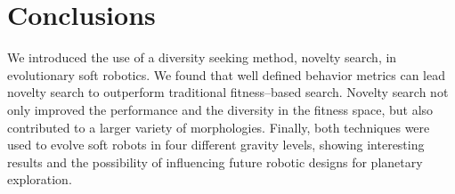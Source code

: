 \documentclass{sig-alternate}
\begin{document}
\section{Conclusions}
We introduced the use of a diversity seeking method, novelty search, in evolutionary soft robotics. 
We found that well defined behavior metrics can lead novelty search to outperform traditional fitness--based search. Novelty search not only improved the performance and the diversity in the fitness space, but also contributed to a larger variety of morphologies. Finally, both techniques were used to evolve soft robots in four different gravity levels, showing interesting results and the possibility of influencing future robotic designs for planetary exploration.


\balance

\end{document}
